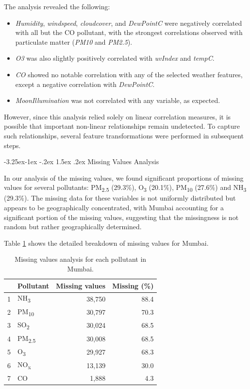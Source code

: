 \documentclass[twoside,11pt]{article}
\makeatletter
\renewcommand\subsubsection{\@startsection{subsubsection}{3}{\z@}%
  {-3.25ex\@plus -1ex \@minus -.2ex}%
  {1.5ex \@plus .2ex}%
  {\normalfont\bfseries\normalsize}}
\makeatother
\begin{document}
The analysis revealed the following:
\begin{itemize}
    \item \textit{Humidity}, \textit{windspeed}, \textit{cloudcover}, and \textit{DewPointC} were negatively correlated with all but the CO pollutant, with the strongest correlations observed with particulate matter (\textit{PM10} and \textit{PM2.5}).
    \item \textit{O3} was also slightly positively correlated with \textit{uvIndex} and \textit{tempC}.
    \item \textit{CO} showed no notable correlation with any of the selected weather features, except a negative correlation with \textit{DewPointC}.
    \item \textit{MoonIllumination} was not correlated with any variable, as expected.
\end{itemize}

However, since this analysis relied solely on linear correlation measures, it is possible that important non-linear relationships remain undetected. To capture such relationships, several feature transformations were performed in subsequent steps.

\subsubsection{Missing Values Analysis}

In our analysis of the missing values, we found significant proportions of missing values for several pollutants: PM\textsubscript{2.5} (29.3\%), O\textsubscript{3} (20.1\%), PM\textsubscript{10} (27.6\%) and NH\textsubscript{3} (29.3\%). The missing data for these variables is not uniformly distributed but appears to be geographically concentrated, with Mumbai accounting for a significant portion of the missing values, suggesting that the missingness is not random but rather geographically determined.

Table \ref{tab:missing_values} shows the detailed breakdown of missing values for Mumbai.

\begin{table}[ht]
\centering
\begin{tabular}{llrr}
\hline
& Pollutant & Missing values & Missing (\%) \\
\hline
1 & NH\textsubscript{3} & 38,750 & 88.4 \\
2 & PM\textsubscript{10} & 30,797 & 70.3 \\
3 & SO\textsubscript{2} & 30,024 & 68.5 \\
4 & PM\textsubscript{2.5} & 30,008 & 68.5 \\
5 & O\textsubscript{3} & 29,927 & 68.3 \\
6 & NO\textsubscript{x} & 13,139 & 30.0 \\
7 & CO & 1,888 & 4.3 \\
\hline
\end{tabular}
\caption{Missing values analysis for each pollutant in Mumbai.}
\label{tab:missing_values}
\end{table}
\end{document}
